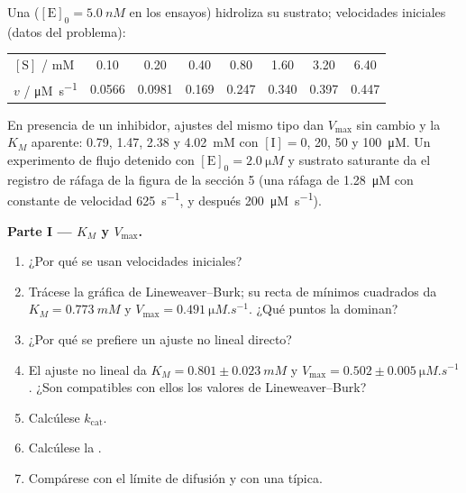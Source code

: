 \begin{problem}
\label{pb:b3:complex-kinetics:1}
Una  ($[\mathrm E]_0 = \qty{5.0}{nM}$ en los ensayos) hidroliza su sustrato; velocidades iniciales
(datos del problema):
\begin{center}\small
\begin{tabular}{lccccccc}
\hline
$[\mathrm S]$ / mM & 0.10 & 0.20 & 0.40 & 0.80 & 1.60 & 3.20 & 6.40 \\
$v$ / \unit{\micro M.s^{-1}} & 0.0566 & 0.0981 & 0.169 & 0.247 & 0.340 & 0.397 & 0.447 \\ \hline
\end{tabular}
\end{center}
En presencia de un inhibidor, ajustes del mismo tipo dan $V_{\max}$ sin cambio y
la $K_M$ aparente: 0.79, 1.47, 2.38 y \qty{4.02}{mM} con $[\mathrm I] = 0$, 20, 50 y
\qty{100}{\micro M}. Un experimento de flujo detenido con $[\mathrm E]_0 = \qty{2.0}{\micro M}$ y sustrato saturante
da el registro de ráfaga de la figura de la sección 5 (una ráfaga de \qty{1.28}{\micro M}
con constante de velocidad \qty{625}{s^{-1}}, y después \qty{200}{\micro M.s^{-1}}).

\medskip\noindent\textbf{Parte I --- $K_M$ y $V_{\max}$.}
\begin{enumerate}
  \item ¿Por qué se usan velocidades iniciales?
  \item Trácese la gráfica de Lineweaver--Burk; su recta de mínimos cuadrados da $K_M =
        \qty{0.773}{mM}$ y $V_{\max} = \qty{0.491}{\micro M.s^{-1}}$. ¿Qué puntos la dominan?
  \item ¿Por qué se prefiere un ajuste no lineal directo?
  \item El ajuste no lineal da $K_M = 0.801 \pm \qty{0.023}{mM}$ y $V_{\max} = 0.502 \pm
        \qty{0.005}{\micro M.s^{-1}}$. ¿Son compatibles con ellos los valores de Lineweaver--Burk?
  \item Calcúlese $k_{\mathrm{cat}}$.
  \item Calcúlese la .
  \item Compárese con el límite de difusión y con una  típica.
\end{enumerate}


\end{problem}
